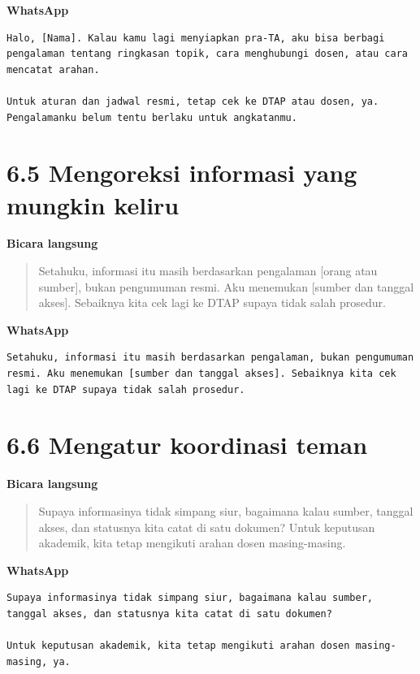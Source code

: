 \documentclass[
  indonesian,
]{article}
\renewcommand{\subsection}{\section}
\begin{document}
\textbf{WhatsApp}

\begin{verbatim}
Halo, [Nama]. Kalau kamu lagi menyiapkan pra-TA, aku bisa berbagi pengalaman tentang ringkasan topik, cara menghubungi dosen, atau cara mencatat arahan.

Untuk aturan dan jadwal resmi, tetap cek ke DTAP atau dosen, ya. Pengalamanku belum tentu berlaku untuk angkatanmu.
\end{verbatim}

\subsection{6.5 Mengoreksi informasi yang mungkin
keliru}\label{mengoreksi-informasi-yang-mungkin-keliru}

\textbf{Bicara langsung}

\begin{quote}
Setahuku, informasi itu masih berdasarkan pengalaman {[}orang atau
sumber{]}, bukan pengumuman resmi. Aku menemukan {[}sumber dan tanggal
akses{]}. Sebaiknya kita cek lagi ke DTAP supaya tidak salah prosedur.
\end{quote}

\textbf{WhatsApp}

\begin{verbatim}
Setahuku, informasi itu masih berdasarkan pengalaman, bukan pengumuman resmi. Aku menemukan [sumber dan tanggal akses]. Sebaiknya kita cek lagi ke DTAP supaya tidak salah prosedur.
\end{verbatim}

\subsection{6.6 Mengatur koordinasi
teman}\label{mengatur-koordinasi-teman}

\textbf{Bicara langsung}

\begin{quote}
Supaya informasinya tidak simpang siur, bagaimana kalau sumber, tanggal
akses, dan statusnya kita catat di satu dokumen? Untuk keputusan
akademik, kita tetap mengikuti arahan dosen masing-masing.
\end{quote}

\textbf{WhatsApp}

\begin{verbatim}
Supaya informasinya tidak simpang siur, bagaimana kalau sumber, tanggal akses, dan statusnya kita catat di satu dokumen?

Untuk keputusan akademik, kita tetap mengikuti arahan dosen masing-masing, ya.
\end{verbatim}
\end{document}

